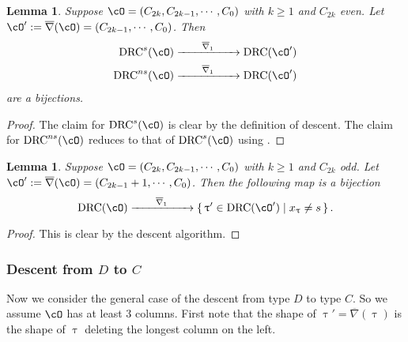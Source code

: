 \documentclass[12pt,a4paper]{amsart}
\def\eDD{\overline{\nabla}}
\def\eDDo{\overline{\nabla}_1}
\numberwithin{equation}{section}
\newtheorem{lem}[thm]{Lemma}
\theoremstyle{remark}
\def\drc{\mathrm{DRC}}
\def\drcs{\mathrm{DRC}^{s}}
\def\drcns{\mathrm{DRC}^{ns}}
\def\cOp{\cO^{\prime}}
\def\uptaup{\uptau^{\prime}}
\begin{document}
\begin{lem}\label{lem:ds.CD}
  Suppose $\cO = (C_{2k},C_{2k-1}, \cdots, C_{0})$ with $k\geq 1$ and $C_{2k}$ even.
  Let $\cOp := \eDD(\cO)=(C_{2k-1},\cdots, C_{0})$.
  Then
  \[
    \begin{split}
      \drcs(\cO) &\xrightarrow{\hspace{2em}\eDDo\hspace{2em}} \drc(\cOp) \\
      \drcns(\cO)&
      \xrightarrow{\hspace{2em}\eDDo\hspace{2em}} \drc(\cOp)
    \end{split}
  \]
  are a bijections.
\end{lem}
\begin{proof}
  The claim for $\drcs(\cO)$ is clear by the definition of descent.
  The claim for $\drcns(\cO)$ reduces to that of $\drcs(\cO)$ using .
\end{proof}

\begin{lem}\label{lem:gd.CD}
  Suppose $\cO = (C_{2k},C_{2k-1}, \cdots, C_{0})$ with $k\geq 1$ and $C_{2k}$ odd.
  Let $\cOp := \eDD(\cO)=(C_{2k-1}+1,\cdots, C_{0})$.
  Then the following map is a bijection
  \[
      \drc(\cO) \xrightarrow{\hspace{2em}\eDDo\hspace{2em}} \set{\uptaup\in \drc(\cOp)| x_{\uptau}\neq s}. %
  \]
\end{lem}
\begin{proof}
  This is clear by the descent algorithm.
\end{proof}
\subsubsection{Descent from $D$ to $C$} Now we consider the general case of the
descent from type $D$ to type $C$. So we assume $\cO$ has at least 3 columns.
First note that the shape of $\uptau' = \eDD(\uptau)$ is the shape of $\uptau$ deleting the
longest column on the left.
\end{document}
